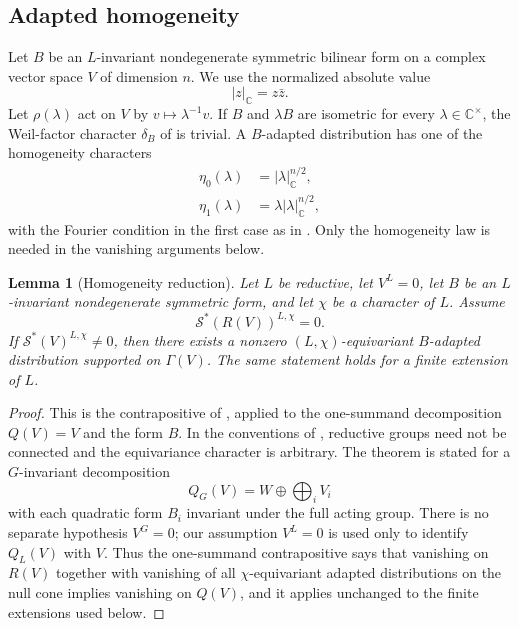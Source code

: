 \documentclass[11pt,reqno]{amsart}
\numberwithin{equation}{section}
\newtheorem{lemma}[theorem]{Lemma}
\theoremstyle{definition}
\theoremstyle{remark}
\newcommand{\C}{\mathbb C}
\newcommand{\cS}{\mathcal S}
\newcommand{\absC}[1]{\lvert #1\rvert_{\C}}
\begin{document}
\subsection{Adapted homogeneity}

Let $B$ be an $L$-invariant nondegenerate symmetric bilinear form on a complex
vector space $V$ of dimension $n$.  We use the normalized absolute value
\[
 \absC{z}=z\bar z.
\]
Let $\rho(\lambda)$ act on $V$ by $v\mapsto\lambda^{-1}v$.  If $B$ and
$\lambda B$ are isometric for every $\lambda\in\C^\times$, the Weil-factor
character $\delta_B$ of \cite[Notation~5.1.3]{AG09} is trivial.  A
$B$-adapted distribution has one of the homogeneity characters
\begin{align}
 \eta_0(\lambda)&=\absC{\lambda}^{n/2},\label{core:eq:eta0-general}\\
 \eta_1(\lambda)&=\lambda\absC{\lambda}^{n/2},\label{core:eq:eta1-general}
\end{align}
with the Fourier condition in the first case as in
\cite[Definition~5.1.6]{AG09}.  Only the homogeneity law is needed in the
vanishing arguments below.

\begin{lemma}[Homogeneity reduction]\label{core:lem:homogeneity-reduction}
Let $L$ be reductive, let $V^L=0$, let $B$ be an $L$-invariant nondegenerate
symmetric form, and let $\chi$ be a character of $L$.  Assume
\[
 \cS^*(R(V))^{L,\chi}=0.
\]
If $\cS^*(V)^{L,\chi}\ne0$, then there exists a nonzero
$(L,\chi)$-equivariant $B$-adapted distribution supported on $\Gamma(V)$.
The same statement holds for a finite extension of $L$.
\end{lemma}

\begin{proof}
This is the contrapositive of \cite[Theorem~5.2.2]{AG09}, applied to the
one-summand decomposition $Q(V)=V$ and the form $B$.  In the conventions of
\cite{AG09}, reductive groups need not be connected and the equivariance
character is arbitrary.  The theorem is stated for a $G$-invariant
decomposition
\[
 Q_G(V)=W\oplus\bigoplus_i V_i
\]
with each quadratic form $B_i$ invariant under the full acting group.  There is
no separate hypothesis $V^G=0$; our assumption $V^L=0$ is used only to identify
$Q_L(V)$ with $V$.  Thus the one-summand contrapositive says that vanishing on
$R(V)$ together with vanishing of all $\chi$-equivariant adapted distributions
on the null cone implies vanishing on $Q(V)$, and it applies unchanged to the
finite extensions used below.
\end{proof}
\end{document}
